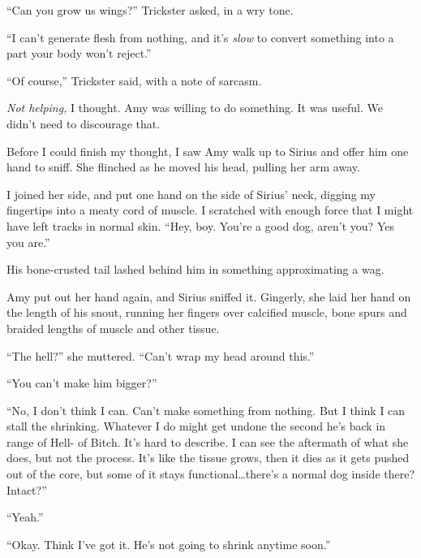 ``Can you grow us wings?'' Trickster asked, in a wry tone.



``I can't generate flesh from nothing, and it's \emph{slow} to convert something into a part your body won't reject.''



``Of course,'' Trickster said, with a note of sarcasm.



\emph{Not helping, }I thought.  Amy was willing to do something.  It was useful.  We didn't need to discourage that.



Before I could finish my thought, I saw Amy walk up to Sirius and offer him one hand to sniff.  She flinched as he moved his head, pulling her arm away.



I joined her side, and put one hand on the side of Sirius' neck, digging my fingertips into a meaty cord of muscle.  I scratched with enough force that I might have left tracks in normal skin.  ``Hey, boy.  You're a good dog, aren't you?  Yes you are.''



His bone-crusted tail lashed behind him in something approximating a wag.



Amy put out her hand again, and Sirius sniffed it.  Gingerly, she laid her hand on the length of his snout, running her fingers over calcified muscle, bone spurs and braided lengths of muscle and other tissue.



``The hell?'' she muttered.  ``Can't wrap my head around this.''



``You can't make him bigger?''



``No, I don't think I can.  Can't make something from nothing.  But I think I can stall the shrinking.  Whatever I do might get undone the second he's back in range of Hell- of Bitch.  It's hard to describe.  I can see the aftermath of what she does, but not the process.  It's like the tissue grows, then it dies as it gets pushed out of the core, but some of it stays functional\ldots there's a normal dog inside there?  Intact?''



``Yeah.''



``Okay.  Think I've got it.  He's not going to shrink anytime soon.''



